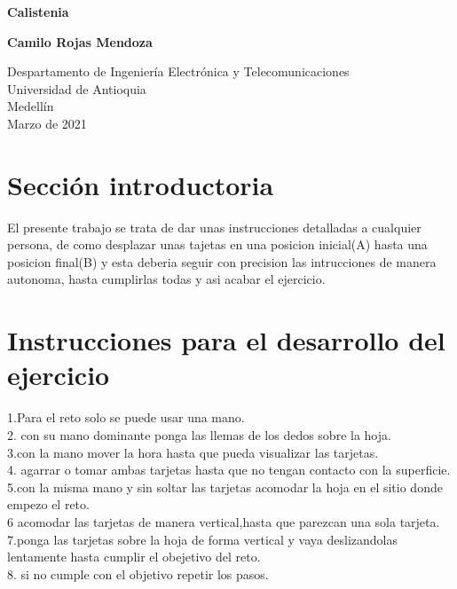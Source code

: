 \documentclass{article}
\begin{document}
\begin{titlepage}
    \begin{center}
        \vspace*{1cm}
            
        \Huge
        \textbf{Calistenia}
            
        
        \vspace{1.5cm}
            
        \textbf{Camilo Rojas Mendoza}
            
        \vfill
            
        \vspace{0.8cm}
            
        \Large
        Despartamento de Ingeniería Electrónica y Telecomunicaciones\\
        Universidad de Antioquia\\
        Medellín\\
        Marzo de 2021
            
    \end{center}
\end{titlepage}

\tableofcontents
\newpage
\section{Sección introductoria}\label{intro}
El presente trabajo se trata de dar unas instrucciones detalladas a cualquier persona, de como desplazar unas tajetas en una posicion inicial(A) hasta una posicion final(B) y esta deberia seguir con precision las intrucciones de manera autonoma, hasta cumplirlas todas y asi acabar el ejercicio.

\section{Instrucciones para el desarrollo del ejercicio} \label{contenido}
1.Para el reto solo se puede usar una mano.\\
2. con su mano dominante ponga las llemas de los dedos sobre la hoja.\\
3.con la mano mover la hora hasta que pueda visualizar las tarjetas.\\
4. agarrar o tomar ambas tarjetas hasta que no tengan contacto con la superficie. \\
5.con la misma mano y sin soltar las tarjetas acomodar la hoja en el sitio donde empezo el reto.\\
6 acomodar las tarjetas de manera vertical,hasta que parezcan una sola tarjeta.\\
7.ponga las tarjetas sobre la hoja de forma vertical y vaya deslizandolas lentamente hasta cumplir el obejetivo del reto.\\
8. si no cumple con el objetivo repetir los pasos.
\end{document}
